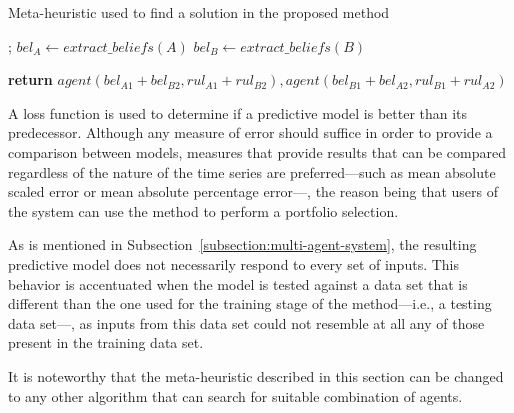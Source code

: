 \documentclass{ieeeaccess}
\begin{document}
\begin{algorithm}
\caption{Meta-heuristic used to find a solution in the proposed method}
    \label{algorithm:meta-heuristic}
\begin{algorithmic}[1]
    ;
    \State $bel_A\gets extract\_beliefs(A)$
    \State $bel_B\gets extract\_beliefs(B)$

    \State \textbf{return} $agent(bel_{A1} + bel_{B2}, rul_{A1} + rul_{B2}),
    agent(bel_{B1} + bel_{A2}, rul_{B1} + rul_{A2})$
    \EndProcedure
\end{algorithmic}
\end{algorithm}

A loss function is used to determine if a predictive model is better than
its predecessor. Although any measure of error should suffice in order to provide a
comparison between models, measures that provide results that can be compared
regardless of the nature of the time series are preferred---such as mean
absolute scaled error or mean absolute percentage error---, the reason being that
users of the system can use the method to perform a portfolio selection.

As is mentioned in Subsection~\ref{subsection:multi-agent-system}, the
resulting predictive model does not necessarily respond to every set of
inputs. This behavior is accentuated when the model is tested against a data
set that is different than the one used for the training stage of the
method---i.e., a testing data set---, as inputs from this data set could not
resemble at all any of those present in the training data set.

It is noteworthy that the meta-heuristic described in this section can be
changed to any other algorithm that can search for suitable combination of
agents. %

\end{document}
